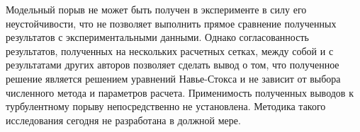 Модельный порыв не может быть получен в эксперименте в силу его неустойчивости, что не позволяет выполнить прямое сравнение полученных результатов с экспериментальными данными. Однако согласованность результатов, полученных на нескольких расчетных сетках, между собой и с результатами других авторов позволяет сделать вывод о том, что полученное решение является решением уравнений Навье-Стокса и не зависит от выбора численного метода и параметров расчета. Применимость полученных выводов к турбулентному порыву непосредственно не установлена. Методика такого исследования сегодня не разработана в должной мере. 



